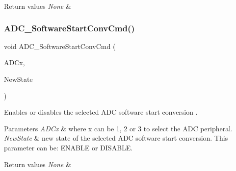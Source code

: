 \begin{DoxyRetVals}{Return values}
{\em None} & \\
\hline
\end{DoxyRetVals}
\mbox{\label{group___a_d_c___exported___functions_ga694130a8d1ad3c8877b7eddb29611b30}} 
\subsubsection{\texorpdfstring{ADC\_SoftwareStartConvCmd()}{ADC\_SoftwareStartConvCmd()}}
{\footnotesize\ttfamily void A\+D\+C\+\_\+\+Software\+Start\+Conv\+Cmd (\begin{DoxyParamCaption}\item[{\mbox{\hyperlink{struct_a_d_c___type_def}{A\+D\+C\+\_\+\+Type\+Def}} $\ast$}]{A\+D\+Cx,  }\item[{\mbox{\hyperlink{group___exported__types_gac9a7e9a35d2513ec15c3b537aaa4fba1}{Functional\+State}}}]{New\+State }\end{DoxyParamCaption})}



Enables or disables the selected A\+DC software start conversion . 


\begin{DoxyParams}{Parameters}
{\em A\+D\+Cx} & where x can be 1, 2 or 3 to select the A\+DC peripheral. \\
\hline
{\em New\+State} & new state of the selected A\+DC software start conversion. This parameter can be\+: E\+N\+A\+B\+LE or D\+I\+S\+A\+B\+LE. \\
\hline
\end{DoxyParams}

\begin{DoxyRetVals}{Return values}
{\em None} & \\
\hline
\end{DoxyRetVals}
\mbox{\label{group___a_d_c___exported___functions_ga5b141d5dbf5f417a11dfa622c8c149d3}} 
